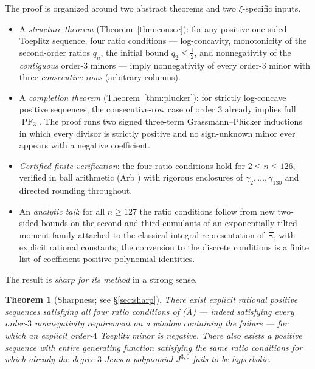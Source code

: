 \documentclass[11pt]{amsart}
\newtheorem{theorem}{Theorem}[section]
\theoremstyle{definition}
\theoremstyle{remark}
\DeclareMathOperator{\PF}{PF}
\begin{document}
The proof is organized around two abstract theorems and two
$\xi$-specific inputs.

\begin{itemize}
\item[\textbf{(A)}] A \emph{structure theorem}
(Theorem~\ref{thm:consec}): for any positive one-sided Toeplitz
sequence, four ratio conditions --- log-concavity, monotonicity of the
second-order ratios $q_n$, the initial bound $q_2\le\tfrac12$, and
nonnegativity of the \emph{contiguous} order-$3$ minors --- imply
nonnegativity of every order-$3$ minor with three \emph{consecutive
rows} (arbitrary columns).
\item[\textbf{(B)}] A \emph{completion theorem}
(Theorem~\ref{thm:plucker}): for strictly log-concave positive
sequences, the consecutive-row case of order $3$ already implies full
$\PF_3$. The proof runs two signed three-term Grassmann--Pl\"ucker
inductions in which every divisor is strictly positive and no
sign-unknown minor ever appears with a negative coefficient.
\item[\textbf{(C)}] \emph{Certified finite verification}: the four
ratio conditions hold for $2\le n\le 126$, verified in ball arithmetic
(Arb \cite{Johansson17}) with rigorous enclosures of $\gamma_2,\dots,
\gamma_{130}$ and directed rounding throughout.
\item[\textbf{(D)}] An \emph{analytic tail}: for all $n\ge 127$ the
ratio conditions follow from new two-sided bounds on the second and
third cumulants of an exponentially tilted moment family attached to
the classical integral representation of $\Xi$, with explicit rational
constants; the conversion to the discrete conditions is a finite list
of coefficient-positive polynomial identities.
\end{itemize}

The result is \emph{sharp for its method} in a strong sense.

\begin{theorem}[Sharpness; see \S\ref{sec:sharp}]\label{thm:sharp-intro}
There exist explicit rational positive sequences satisfying all four
ratio conditions of (A) --- indeed satisfying every order-$3$
nonnegativity requirement on a window containing the failure --- for
which an explicit order-$4$ Toeplitz minor is negative. There also
exists a positive sequence with entire generating function satisfying
the same ratio conditions for which already the degree-$3$ Jensen
polynomial $J^{3,0}$ fails to be hyperbolic.
\end{theorem}
\end{document}
